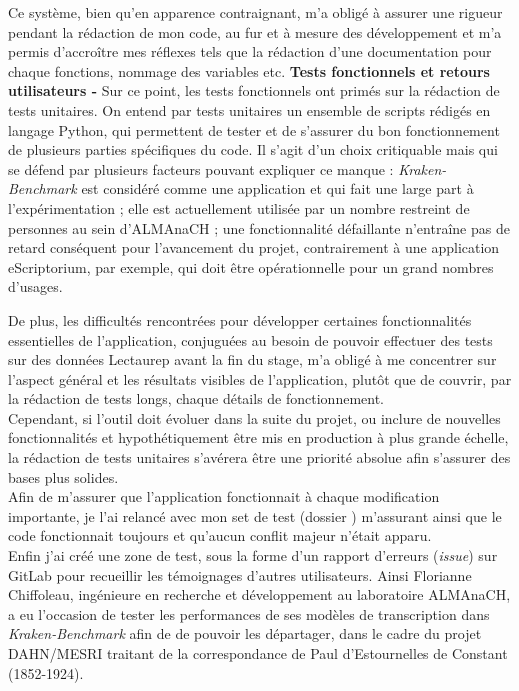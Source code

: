 Ce système, bien qu'en apparence contraignant, m'a obligé à assurer une rigueur pendant la rédaction de mon code, au fur et à mesure des développement et m'a permis d'accroître mes réflexes tels que la rédaction d'une documentation pour chaque fonctions, nommage des variables etc.
\newpage
\textbf{Tests fonctionnels et retours utilisateurs - } Sur ce point, les tests fonctionnels ont primés sur la rédaction de tests unitaires. On entend par tests unitaires un ensemble de scripts rédigés en  langage Python, qui permettent de tester et de s'assurer du bon fonctionnement de plusieurs parties spécifiques du code. Il s'agit d'un choix critiquable mais qui se défend par plusieurs facteurs pouvant expliquer ce manque : \textit{Kraken-Benchmark} est considéré comme une application  et qui fait une large part à l'expérimentation ; elle est actuellement utilisée par un nombre restreint de personnes au sein d'ALMAnaCH ; une fonctionnalité défaillante n'entraîne pas de retard conséquent pour l'avancement du projet, contrairement à une application eScriptorium, par exemple, qui doit être opérationnelle pour un grand nombres d'usages. 

De plus, les difficultés rencontrées pour développer certaines fonctionnalités essentielles de l'application, conjuguées au besoin de pouvoir effectuer des tests sur des données Lectaurep avant la fin du stage, m'a obligé à me concentrer sur l'aspect général et les résultats visibles de l'application, plutôt que de couvrir, par la rédaction de tests longs, chaque détails de fonctionnement.\\

Cependant, si l'outil doit évoluer dans la suite du projet, ou inclure de nouvelles fonctionnalités et hypothétiquement être mis en production à plus grande échelle, la rédaction de tests unitaires s'avérera être une priorité absolue afin s'assurer des bases plus solides.\\

Afin de m'assurer que l'application fonctionnait à chaque modification importante, je l'ai relancé avec mon set de test (dossier ) m'assurant ainsi que le code fonctionnait toujours et qu'aucun conflit majeur n'était apparu.\\

Enfin j'ai créé une zone de test, sous la forme d'un rapport d'erreurs (\textit{issue}) sur GitLab pour recueillir les témoignages d'autres utilisateurs. Ainsi Florianne Chiffoleau, ingénieure en recherche et développement au laboratoire  ALMAnaCH, a eu l'occasion de tester les performances de ses modèles de transcription dans \textit{Kraken-Benchmark} afin de de pouvoir les départager, dans le cadre du projet DAHN/MESRI traitant de la correspondance de Paul d'Estournelles de Constant (1852-1924).\\

